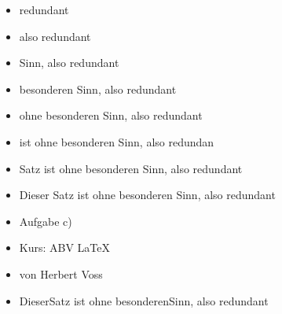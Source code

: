 \documentclass[professionalfonts]{beamer}
\begin{document}
	\begin{frame}
		\begin{itemize}
			\item<1-> redundant 
			\item<2-> also redundant 
			\item<3-> Sinn, also redundant 
			\item<4-> besonderen Sinn, also redundant 
			\item<5-> ohne besonderen Sinn, also redundant
			\item<6-> ist ohne besonderen Sinn, also redundan
			\item<7-> Satz ist ohne besonderen Sinn, also redundant
			\item<8-> Dieser Satz ist ohne besonderen Sinn, also redundant 
		\end{itemize}
	\end{frame}
{
	\begin{frame}
		\begin{itemize}
			\item{Aufgabe c)}
			\item{Kurs: ABV \LaTeX }
			\item{von Herbert Voss}
		\end{itemize}
	\end{frame}
}
	
	\begin{frame}
		\begin{itemize}
			\item \pause[8]Dieser\pause[7] Satz \pause[6] ist \pause[5] ohne \pause[4] besonderen\pause[3] Sinn, \pause[2]also \pause[1] redundant
		\end{itemize}
	\end{frame}
\end{document}
